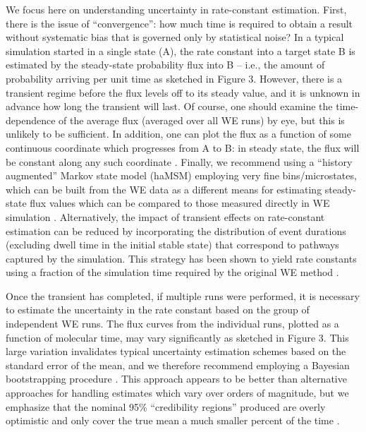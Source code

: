 \documentclass[9pt,tutorial]{livecoms}
\begin{document}
We focus here on understanding uncertainty in rate-constant estimation. 
First, there is the issue of “convergence”: how much time is required to obtain a result without systematic bias that is governed only by statistical noise? 
In a typical simulation started in a single state (A), the rate constant into a target state B is estimated by the steady-state probability flux into B -- i.e., the amount of probability arriving per unit time as sketched in Figure 3. 
However, there is a transient regime before the flux levels off to its steady value, and it is unknown in advance how long the transient will last. 
Of course, one should examine the time-dependence of the average flux (averaged over all WE runs) by eye, but this is unlikely to be sufficient. 
In addition, one can plot the flux as a function of some continuous coordinate which progresses from A to B: in steady state, the flux will be constant along any such coordinate \citep{Jeremy2019}.
Finally, we recommend using a “history augmented” Markov state model (haMSM) employing very fine bins/microstates, which can be built from the WE data as a different means for estimating steady-state flux values which can be compared to those measured directly in WE simulation \citep{Jeremy2019}. 
Alternatively, the impact of transient effects on rate-constant estimation can be reduced by incorporating the distribution of event durations (excluding dwell time in the initial stable state) that correspond to pathways captured by the simulation. 
This strategy has been shown to yield rate constants using a fraction of the simulation time required by the original WE method \citep{DeGrave2019}. 

Once the transient has completed, if multiple runs were performed, it is necessary to estimate the uncertainty in the rate constant based on the group of independent WE runs. 
The flux curves from the individual runs, plotted as a function of molecular time, may vary significantly as sketched in Figure 3. 
This large variation invalidates typical uncertainty estimation schemes based on the standard error of the mean, and we therefore recommend employing a Bayesian bootstrapping procedure \citep{MostofianJCTC2019}. 
This approach appears to be better than alternative approaches for handling estimates which vary over orders of magnitude, but we emphasize that the nominal 95\% “credibility regions” produced are overly optimistic and only cover the true mean a much smaller percent of the time \citep{MostofianJCTC2019}.
\end{document}
